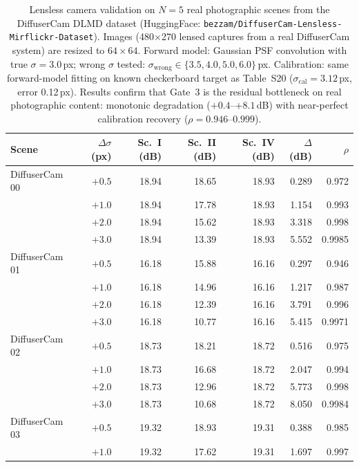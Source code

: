 \documentclass[11pt]{article}
\theoremstyle{definition}
\begin{document}
\begin{table}[htbp]
\centering
\caption{Lensless camera validation on $N{=}5$ real photographic scenes from the
DiffuserCam DLMD dataset \cite{Antipa2018} (HuggingFace: \texttt{bezzam/DiffuserCam-Lensless-Mirflickr-Dataset}).
Images (480$\times$270 lensed captures from a real DiffuserCam system) are resized to $64{\times}64$.
Forward model: Gaussian PSF convolution with true $\sigma{=}3.0$\,px; wrong $\sigma$ tested:
$\sigma_\mathrm{wrong} \in \{3.5, 4.0, 5.0, 6.0\}$\,px.
Calibration: same forward-model fitting on known checkerboard target as Table~S20
($\sigma_\mathrm{cal}{=}3.12$\,px, error 0.12\,px).
Results confirm that Gate~3 is the residual bottleneck on real photographic content: monotonic degradation ($+0.4$--$+8.1$\,dB)
with near-perfect calibration recovery ($\rho{=}0.946$--$0.999$).}
\label{tab:lensless_real}
\small
\begin{tabular}{l r r r r r r}
\toprule
Scene & $\Delta\sigma$ (px) & Sc.~I (dB) & Sc.~II (dB) & Sc.~IV (dB) & $\Delta$(dB) & $\rho$ \\
\midrule
DiffuserCam\,00 & $+0.5$ & 18.94 & 18.65 & 18.93 & 0.289 & 0.972 \\
                & $+1.0$ & 18.94 & 17.78 & 18.93 & 1.154 & 0.993 \\
                & $+2.0$ & 18.94 & 15.62 & 18.93 & 3.318 & 0.998 \\
                & $+3.0$ & 18.94 & 13.39 & 18.93 & 5.552 & 0.9985 \\
DiffuserCam\,01 & $+0.5$ & 16.18 & 15.88 & 16.16 & 0.297 & 0.946 \\
                & $+1.0$ & 16.18 & 14.96 & 16.16 & 1.217 & 0.987 \\
                & $+2.0$ & 16.18 & 12.39 & 16.16 & 3.791 & 0.996 \\
                & $+3.0$ & 16.18 & 10.77 & 16.16 & 5.415 & 0.9971 \\
DiffuserCam\,02 & $+0.5$ & 18.73 & 18.21 & 18.72 & 0.516 & 0.975 \\
                & $+1.0$ & 18.73 & 16.68 & 18.72 & 2.047 & 0.994 \\
                & $+2.0$ & 18.73 & 12.96 & 18.72 & 5.773 & 0.998 \\
                & $+3.0$ & 18.73 & 10.68 & 18.72 & 8.050 & 0.9984 \\
DiffuserCam\,03 & $+0.5$ & 19.32 & 18.93 & 19.31 & 0.388 & 0.985 \\
                & $+1.0$ & 19.32 & 17.62 & 19.31 & 1.697 & 0.997 \\

\end{tabular}
\end{table}
\end{document}
